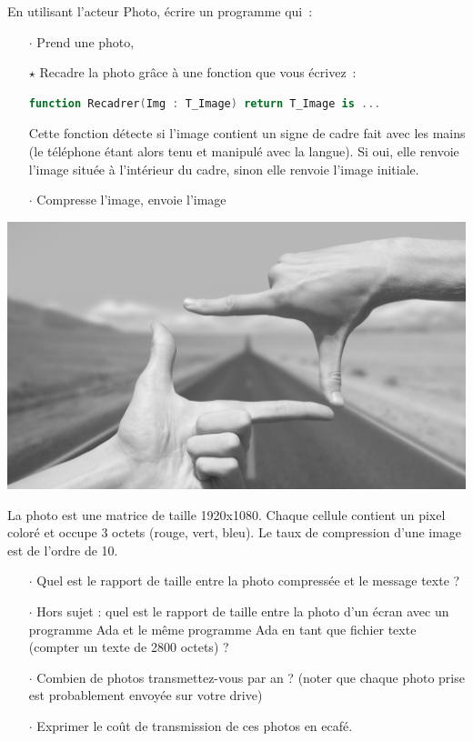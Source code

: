 \begin{minipage}[t]{0.74\textwidth}
En utilisant l'acteur Photo, écrire un programme qui~:

\begin{itemize}
\item[$\cdot$] Prend une photo,
\item[$\star$] Recadre la photo grâce à une fonction que vous écrivez~:
  \begin{lstlisting}[language=Ada]
    function Recadrer(Img : T_Image) return T_Image is ...
  \end{lstlisting}
  Cette fonction détecte si l'image contient un signe de cadre fait avec les mains (le téléphone étant alors tenu et manipulé avec la langue).
  Si oui, elle renvoie l'image située à l'intérieur du cadre, sinon elle renvoie l'image initiale.

\item[$\cdot$] Compresse l'image, envoie l'image
\end{itemize}
\end{minipage}
\hfill
\begin{minipage}[t]{0.25\textwidth}
\includegraphics[width=\linewidth,valign=t]{frame.png}
\end{minipage}
\medskip

\begin{reponse}

\end{reponse}


La photo est une matrice de taille 1920x1080. Chaque cellule contient un pixel coloré et occupe 3 octets (rouge, vert, bleu).
Le taux de compression d'une image est de l'ordre de 10.

\begin{itemize}
\item[$\cdot$] Quel est le rapport de taille entre la photo compressée et le message texte ?
\item[$\cdot$] Hors sujet : quel est le rapport de taille entre la photo d'un écran avec un programme Ada et le même programme Ada en tant que fichier texte (compter un texte de 2800 octets) ?
\item[$\cdot$] Combien de photos transmettez-vous par an ? (noter que chaque photo prise est probablement envoyée sur votre drive)
\item[$\cdot$] Exprimer le coût de transmission de ces photos en ecafé.
\end{itemize}

